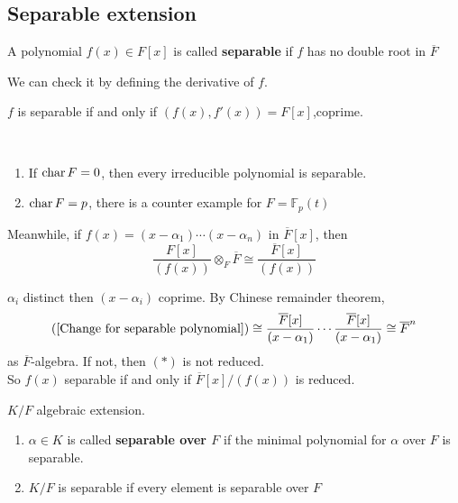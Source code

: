 \subsection{Separable extension}
\begin{definition}
    A polynomial  $ f(x)\in F[x] $ is called \textbf{separable} if  $ f  $ has no double root in  $ \overline{F} $ 
\end{definition}
We can check it by defining the derivative of  $ f  $.
\begin{proposition}
     $ f  $ is separable if and only if  $ (f(x),f'(x))=F[x] $,\ie coprime.
\end{proposition}
\begin{example}
    \,
    \begin{enumerate}[(1)]
        \item If  $ \operatorname{char} F=0 $, then every irreducible polynomial is separable.
        \item  $ \operatorname{char} F =p $, there is a counter example for  $ F=\mathbb{F}_p(t) $  
    \end{enumerate}
\end{example}
Meanwhile, if  $ f(x)=(x-\alpha_1)\cdots(x-\alpha_n) $ in  $ \overline{F}[x] $, then 
\begin{equation}
    \frac{F[x]}{(f(x))}\otimes_F \overline{F}\cong \frac{\overline{F}[x]}{(f(x))}\label{Change for separable polynomial}
\end{equation}

 $ \alpha_i $ distinct then  $ (x-\alpha_i) $ coprime. By Chinese remainder theorem, 
 \[(\ref{Change for separable polynomial})\cong \frac{\overline{F}[x]}{(x-\alpha_1)}\cdots\frac{\overline{F}[x]}{(x-\alpha_1)}\cong \overline{F}^n\] as  $ \overline{F} $-algebra.
 If not, then  $ (\ast ) $ is not reduced.\\
 So  $ f(x)  $ separable if and only if  $ \overline{F}[x]/(f(x)) $ is reduced.
 \begin{definition}
     $ K/F $ algebraic extension.
     \begin{enumerate}[(1)]
         \item $ \alpha\in K  $ is called \textbf{separable over  $ F  $} if the minimal polynomial for  $ \alpha  $ over  $ F  $ is separable.
         \item  $ K/F $ is separable if every element is separable over  $ F $  
     \end{enumerate}
 \end{definition}